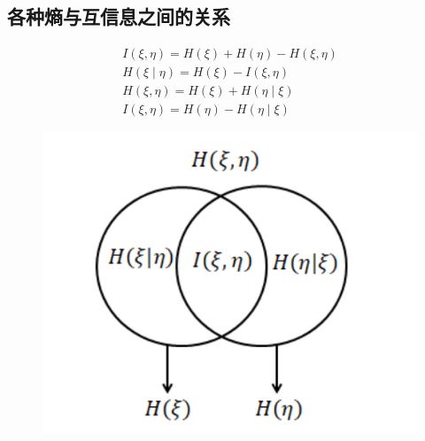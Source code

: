 \subsection{各种熵与互信息之间的关系}
$$
\begin{array}{l}
I(\xi, \eta)=H(\xi)+H(\eta)-H(\xi, \eta) \\
H(\xi \mid \eta)=H(\xi)-I(\xi, \eta) \\
H(\xi, \eta)=H(\xi)+H(\eta \mid \xi) \\
I(\xi, \eta)=H(\eta)-H(\eta \mid \xi)
\end{array}
$$
\begin{figure}[h]
    \centering
    \includegraphics[width=0.4\linewidth]{image/1.png}
\end{figure}




